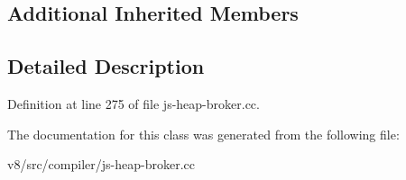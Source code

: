 \subsection*{Additional Inherited Members}


\subsection{Detailed Description}


Definition at line 275 of file js-\/heap-\/broker.\+cc.



The documentation for this class was generated from the following file\+:\begin{DoxyCompactItemize}
\item 
v8/src/compiler/js-\/heap-\/broker.\+cc\end{DoxyCompactItemize}
